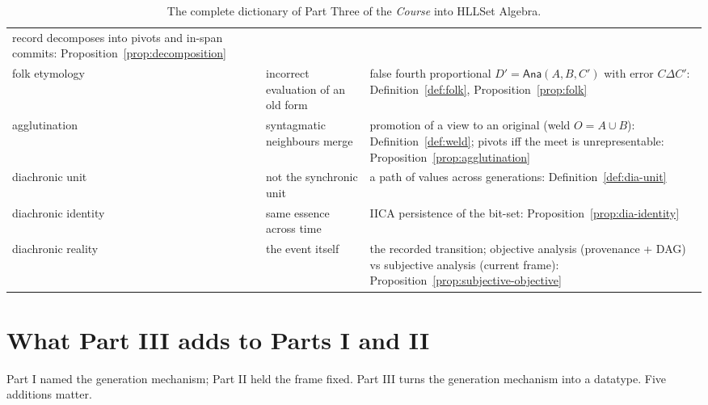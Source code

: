 \documentclass[11pt,a4paper]{article}
\theoremstyle{remark}
\newcommand{\xor}{\ensuremath{\Delta}}                   %
\newcommand{\Ana}{\ensuremath{\mathsf{Ana}}}             %
\begin{document}
\begin{table}[htbp]
\begin{tabular}{@{}>{\raggedright\arraybackslash}p{3.4cm}
                    >{\raggedright\arraybackslash}p{4.2cm}
                    >{\raggedright\arraybackslash}p{7.0cm}@{}}
record decomposes into pivots and in-span commits:
Proposition~\ref{prop:decomposition} \\
folk etymology & incorrect evaluation of an old form & false fourth
proportional $D'=\Ana(A,B,C')$ with error $C\xor C'$:
Definition~\ref{def:folk}, Proposition~\ref{prop:folk} \\
agglutination & syntagmatic neighbours merge & promotion of a view to an
original (weld $O=A\cup B$): Definition~\ref{def:weld}; pivots iff the meet
is unrepresentable: Proposition~\ref{prop:agglutination} \\
diachronic unit & not the synchronic unit & a path of values across
generations: Definition~\ref{def:dia-unit} \\
diachronic identity & same essence across time & IICA persistence of the
bit-set: Proposition~\ref{prop:dia-identity} \\
diachronic reality & the event itself & the recorded transition; objective
analysis (provenance + DAG) vs subjective analysis (current frame):
Proposition~\ref{prop:subjective-objective} \\
\bottomrule
\end{tabular}
\caption{The complete dictionary of Part Three of the \textit{Course} into
HLLSet Algebra.}
\label{tab:dictionary}
\end{table}

\FloatBarrier
\section{What Part III adds to Parts I and II}
\label{sec:adds}

Part I named the generation mechanism; Part II held the frame fixed. Part III
turns the generation mechanism into a datatype. Five additions matter.
\end{document}
